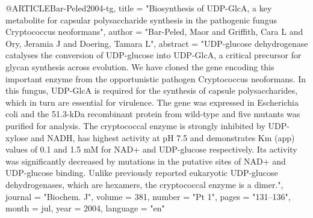 @ARTICLE{Bar-Peled2004-tg,
  title    = "Biosynthesis of {UDP-GlcA}, a key metabolite for capsular
              polysaccharide synthesis in the pathogenic fungus Cryptococcus
              neoformans",
  author   = "Bar-Peled, Maor and Griffith, Cara L and Ory, Jeramia J and
              Doering, Tamara L",
  abstract = "UDP-glucose dehydrogenase catalyses the conversion of UDP-glucose
              into UDP-GlcA, a critical precursor for glycan synthesis across
              evolution. We have cloned the gene encoding this important enzyme
              from the opportunistic pathogen Cryptococcus neoformans. In this
              fungus, UDP-GlcA is required for the synthesis of capsule
              polysaccharides, which in turn are essential for virulence. The
              gene was expressed in Escherichia coli and the 51.3-kDa
              recombinant protein from wild-type and five mutants was purified
              for analysis. The cryptococcal enzyme is strongly inhibited by
              UDP-xylose and NADH, has highest activity at pH 7.5 and
              demonstrates Km (app) values of 0.1 and 1.5 mM for NAD+ and
              UDP-glucose respectively. Its activity was significantly
              decreased by mutations in the putative sites of NAD+ and
              UDP-glucose binding. Unlike previously reported eukaryotic
              UDP-glucose dehydrogenases, which are hexamers, the cryptococcal
              enzyme is a dimer.",
  journal  = "Biochem. J",
  volume   =  381,
  number   = "Pt 1",
  pages    = "131--136",
  month    =  jul,
  year     =  2004,
  language = "en"
}


